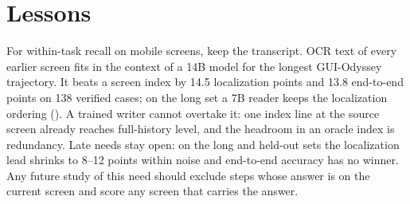 \section{Lessons}
\label{sec:lessons}
For within-task recall on mobile screens, keep the transcript. OCR text of every earlier screen fits in the context of a 14B model for the longest GUI-Odyssey trajectory. It beats a screen index by 14.5 localization points and 13.8 end-to-end points on 138 verified cases; on the long set a 7B reader keeps the localization ordering (). A trained writer cannot overtake it: one index line at the source screen already reaches full-history level, and the headroom in an oracle index is redundancy. Late needs stay open: on the long and held-out sets the localization lead shrinks to 8--12 points within noise and end-to-end accuracy has no winner. Any future study of this need should exclude steps whose answer is on the current screen and score any screen that carries the answer.
